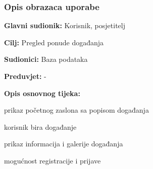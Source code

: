 				
				\subsubsection{Opis obrazaca uporabe}
					

					\noindent {}
					\begin{packed_item}
	
						\item \textbf{Glavni sudionik: }Korisnik, posjetitelj
						\item  \textbf{Cilj:} Pregled ponude događanja
						\item  \textbf{Sudionici:} Baza podataka
						\item  \textbf{Preduvjet:} -
						\item  \textbf{Opis osnovnog tijeka:}
						
						\item[] \begin{packed_enum}
	
							\item prikaz početnog zaslona sa popisom događanja
							\item korisnik bira događanje 
							\item prikaz informacija i galerije događanja
							\item mogućnost registracije i prijave
						\end{packed_enum}
						
					\end{packed_item}
					
